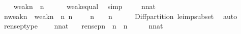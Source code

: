 \begin{isabellebody}
\ \ \isamarkupfalse%
\ {\isachardoublequoteopen}weak{\isacharparenleft}{\kern0pt}n{\isacharcomma}{\kern0pt}{}{\isacharparenright}{\kern0pt}\ {\isacharequal}{\kern0pt}\ n{\isacharhash}{\kern0pt}{\isacharplus}{\kern0pt}{}{\isacharminus}{\kern0pt}{}{\isachardoublequoteclose}\isanewline
\ \ \ \ \isamarkupfalse%
\ weak{\isacharunderscore}{\kern0pt}equal\ \isamarkupfalse%
\ simp\isanewline
\ \ \isamarkupfalse%
\ \ {\isacartoucheopen}n{\isasymin}nat{\isacartoucheclose}\isanewline
\ \ \isamarkupfalse%
\ {\isachardoublequoteopen}{\isacharparenleft}{\kern0pt}{}{\isacharhash}{\kern0pt}{\isacharplus}{\kern0pt}n{\isacharminus}{\kern0pt}weak{\isacharparenleft}{\kern0pt}n{\isacharcomma}{\kern0pt}{}{\isacharparenright}{\kern0pt}{\isacharparenright}{\kern0pt}\ {\isasymunion}\ weak{\isacharparenleft}{\kern0pt}n{\isacharcomma}{\kern0pt}{}{\isacharparenright}{\kern0pt}\ {\isacharequal}{\kern0pt}\ {}{\isacharhash}{\kern0pt}{\isacharplus}{\kern0pt}n{\isachardoublequoteclose}\ {\isachardoublequoteopen}{}{\isacharhash}{\kern0pt}{\isacharplus}{\kern0pt}n\ {\isasymunion}\ {\isacharparenleft}{\kern0pt}\ {}\ {\isacharhash}{\kern0pt}{\isacharplus}{\kern0pt}\ n\ {\isacharminus}{\kern0pt}\ {}{\isacharparenright}{\kern0pt}\ {\isacharequal}{\kern0pt}\ {}{\isacharhash}{\kern0pt}{\isacharplus}{\kern0pt}n{\isachardoublequoteclose}\isanewline
\ \ \ \ \isamarkupfalse%
\ Diff{\isacharunderscore}{\kern0pt}partition\ le{\isacharunderscore}{\kern0pt}imp{\isacharunderscore}{\kern0pt}subset\ \isamarkupfalse%
\ auto\isanewline
{}\isamarkupfalse%
%
\endisatagproof
{\isafoldproof}%
%
\isadelimproof
\isanewline
%
\endisadelimproof
\isanewline
{}\isamarkupfalse%
\ rensep{\isacharunderscore}{\kern0pt}type\ {\isacharcolon}{\kern0pt}\isanewline
\ \ \ {\isachardoublequoteopen}n{\isasymin}nat{\isachardoublequoteclose}\isanewline
\ \ \ {\isachardoublequoteopen}rensep{\isacharparenleft}{\kern0pt}n{\isacharparenright}{\kern0pt}\ {\isasymin}\ {}{\isacharhash}{\kern0pt}{\isacharplus}{\kern0pt}n\ {\isasymrightarrow}\ {}{\isacharhash}{\kern0pt}{\isacharplus}{\kern0pt}n{\isachardoublequoteclose}\isanewline
%
\isadelimproof
%
\endisadelimproof
%
\isatagproof
{}\isamarkupfalse%
\ {\isacharminus}{\kern0pt}\isanewline
\ \ \isamarkupfalse%
\ {\isacartoucheopen}n{\isasymin}nat{\isacartoucheclose}\isanewline

\end{isabellebody}

